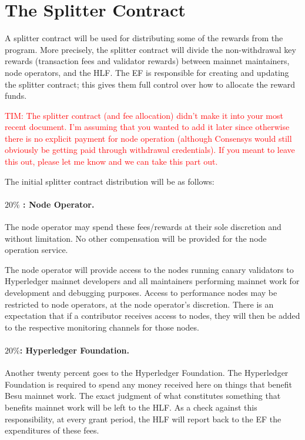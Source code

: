 
\section{The Splitter Contract} \label{sec:splitter}
A splitter contract will be used for distributing some of the rewards from the program.  More precisely, the splitter contract will divide the non-withdrawal key rewards (transaction fees and validator rewards) between mainnet maintainers, node operators, and the HLF.  The EF is responsible for creating and updating the splitter contract; this gives them full control over how to allocate the reward funds.

\textcolor{red}{TIM:  The splitter contract (and fee allocation) didn't make it into your most recent document.  I'm assuming that you wanted to add it later since otherwise there is no explicit payment for node operation (although Consensys would still obviously be getting paid through withdrawal credentials).  If you meant to leave this out, please let me know and we can take this part out.}

The initial splitter contract distribution will be as follows:

\paragraph{$20\%$ : \textbf{Node Operator}.}  The node operator may spend these fees/rewards at their sole discretion and without limitation. No other compensation will be provided for the node operation service.

The node operator will provide access to the nodes running canary validators to Hyperledger mainnet developers and all maintainers performing mainnet work for development and debugging purposes. Access to performance nodes may be restricted to node operators, at the node operator’s discretion. There is an expectation that if a contributor receives access to nodes, they will then be added to the respective monitoring channels for those nodes.

\paragraph{$20\%$:  \textbf{Hyperledger Foundation}.}  Another twenty percent goes to the Hyperledger Foundation.  The Hyperledger Foundation is required to spend any money received here on things that benefit Besu mainnet work.  The exact judgment of what constitutes something that benefits mainnet work will be left to the HLF.  As a check against this responsibility, at every grant period, the HLF will report back to the EF the expenditures of these fees.

